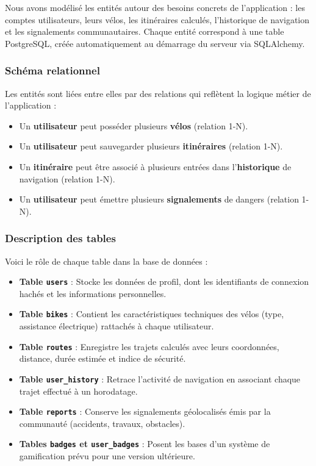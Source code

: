 Nous avons modélisé les entités autour des besoins concrets de l'application : les comptes utilisateurs, leurs vélos, les itinéraires calculés, l'historique de navigation et les signalements communautaires. Chaque entité correspond à une table PostgreSQL, créée automatiquement au démarrage du serveur via SQLAlchemy.

\subsubsection{Schéma relationnel}

Les entités sont liées entre elles par des relations qui reflètent la logique métier de l'application :
\begin{itemize}
    \item Un \textbf{utilisateur} peut posséder plusieurs \textbf{vélos} (relation 1-N).
    \item Un \textbf{utilisateur} peut sauvegarder plusieurs \textbf{itinéraires} (relation 1-N).
    \item Un \textbf{itinéraire} peut être associé à plusieurs entrées dans l'\textbf{historique} de navigation (relation 1-N).
    \item Un \textbf{utilisateur} peut émettre plusieurs \textbf{signalements} de dangers (relation 1-N).
\end{itemize}

\subsubsection{Description des tables}

Voici le rôle de chaque table dans la base de données :

\begin{itemize}
    \item \textbf{Table \texttt{users}} : Stocke les données de profil, dont les identifiants de connexion hachés et les informations personnelles.
    \item \textbf{Table \texttt{bikes}} : Contient les caractéristiques techniques des vélos (type, assistance électrique) rattachés à chaque utilisateur.
    \item \textbf{Table \texttt{routes}} : Enregistre les trajets calculés avec leurs coordonnées, distance, durée estimée et indice de sécurité.
    \item \textbf{Table \texttt{user\_history}} : Retrace l'activité de navigation en associant chaque trajet effectué à un horodatage.
    \item \textbf{Table \texttt{reports}} : Conserve les signalements géolocalisés émis par la communauté (accidents, travaux, obstacles).
    \item \textbf{Tables \texttt{badges} et \texttt{user\_badges}} : Posent les bases d'un système de gamification prévu pour une version ultérieure.
\end{itemize}

